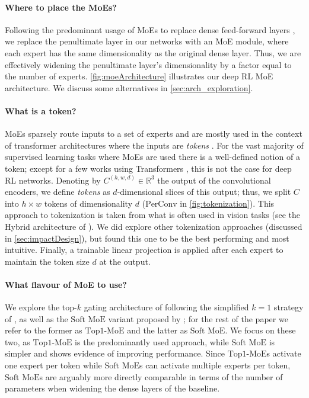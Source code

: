 \documentclass{article}
\theoremstyle{plain}
\theoremstyle{definition}
\theoremstyle{remark}
\newcommand{\moe}{$\textrm{Top1-MoE}$}
\newcommand{\softmoe}{$\textrm{Soft MoE}$}
\newcommand{\token}[1]{$\textrm{#1}$}
\begin{document}
\paragraph{Where to place the MoEs?} Following the predominant usage of MoEs to replace dense feed-forward layers \citep{shazeer2017outrageously,fedus2022switch,gale2023megablocks}, we replace the penultimate layer in our networks with an MoE module, where each expert has the same dimensionality as the original dense layer. Thus, we are effectively widening the penultimate layer's dimensionality by a factor equal to the number of experts. \cref{fig:moeArchitecture} illustrates our deep RL MoE architecture. We discuss some alternatives in \cref{sec:arch_exploration}.


\paragraph{What is a token?} MoEs sparsely route inputs to a set of experts \citep{shazeer2017outrageously} and are mostly used in the context of transformer architectures where the inputs are {\em tokens} \citep{fedus2022switch}. For the vast majority of supervised learning tasks where MoEs are used there is a well-defined notion of a token; except for a few works using Transformers \citep{chen2021decisiontransformer}, this is not the case for deep RL networks. Denoting by $C^{(h,w,d)}\in\mathbb{R}^{3}$ the output of the convolutional encoders, we define \emph{tokens} as $d$-dimensional slices of this output; thus, we split $C$ into $h\times w$ tokens of dimensionality $d$ (\token{PerConv} in \cref{fig:tokenization}). This approach to tokenization is taken from what is often used in vision tasks (see the Hybrid architecture of \citet{dosovitskiy2021an}). We did explore other tokenization approaches (discussed in \cref{sec:impactDesign}), but found this one to be the best performing and most intuitive. Finally, a trainable linear projection is applied after each expert to maintain the token size $d$ at the output. 


\paragraph{What flavour of MoE to use?} 
We explore the top-$k$ gating architecture of \citet{shazeer2017outrageously} following the simplified $k=1$ strategy of \citet{fedus2022switch}, as well as the \softmoe{} variant proposed by \citet{puigcerver2023sparse}; for the rest of the paper we refer to the former as \moe{} and the latter as \softmoe{}. We focus on these two, as \moe{} is the predominantly used approach, while \softmoe{} is simpler and shows evidence of improving performance. Since \moe{}s activate one expert per token while \softmoe{}s can activate multiple experts per token, \softmoe{}s are arguably more directly comparable in terms of the number of parameters when widening the dense layers of the baseline.
\end{document}
